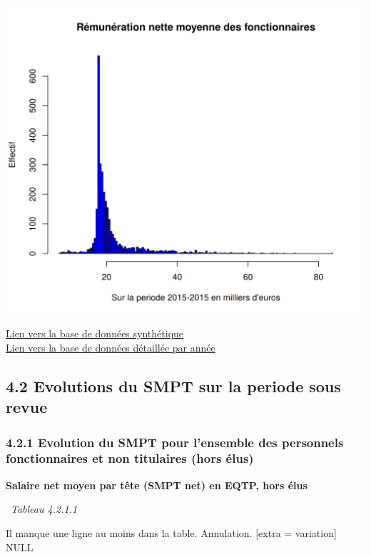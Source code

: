 \includegraphics{altair_files/figure-latex/unnamed-chunk-116-1.png}

\href{../Bases/Remunerations/Analyse.variations.csv}{Lien vers la base de
données synthétique}\\
\href{../Bases/Remunerations/Analyse.variations.par.exercice.csv}{Lien vers
la base de données détaillée par année}

\hypertarget{evolutions-du-smpt-sur-la-periode-sous-revue}{%
\subsection{4.2 Evolutions du SMPT sur la periode sous
revue}\label{evolutions-du-smpt-sur-la-periode-sous-revue}}

\hypertarget{evolution-du-smpt-pour-lensemble-des-personnels-fonctionnaires-et-non-titulaires-hors-elus}{%
\subsubsection{4.2.1 Evolution du SMPT pour l'ensemble des personnels
fonctionnaires et non titulaires (hors
élus)}\label{evolution-du-smpt-pour-lensemble-des-personnels-fonctionnaires-et-non-titulaires-hors-elus}}

\textbf{Salaire net moyen par tête (SMPT net) en EQTP, hors élus}

~\emph{Tableau 4.2.1.1}

Il manque une ligne au moins dans la table. Annulation. {[}extra =
variation{]}\\
NULL

